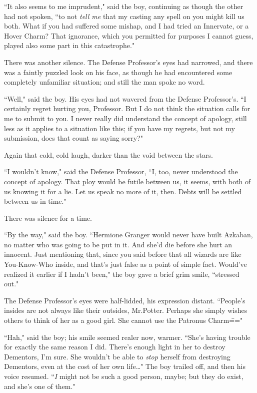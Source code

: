 ``It also seems to me imprudent," said the boy, continuing as though the other had not spoken, ``to not \emph{tell me} that my casting any spell on you might kill us both. What if you had suffered some mishap, and I had tried an Innervate, or a Hover Charm? That ignorance, which you permitted for purposes I cannot guess, played also some part in this catastrophe."

There was another silence. The Defense Professor's eyes had narrowed, and there was a faintly puzzled look on his face, as though he had encountered some completely unfamiliar situation; and still the man spoke no word.

``Well," said the boy. His eyes had not wavered from the Defense Professor's. ``I certainly regret hurting you, Professor. But I do not think the situation calls for me to submit to you. I never really did understand the concept of apology, still less as it applies to a situation like this; if you have my regrets, but not my submission, does that count as saying sorry?"

Again that cold, cold laugh, darker than the void between the stars.

``I wouldn't know," said the Defense Professor, ``I, too, never understood the concept of apology. That ploy would be futile between us, it seems, with both of us knowing it for a lie. Let us speak no more of it, then. Debts will be settled between us in time."

There was silence for a time.

``By the way," said the boy. ``Hermione Granger would never have built Azkaban, no matter who was going to be put in it. And she'd die before she hurt an innocent. Just mentioning that, since you said before that all wizards are like You-Know-Who inside, and that's just false as a point of simple fact. Would've realized it earlier if I hadn't been," the boy gave a brief grim smile, ``stressed out."

The Defense Professor's eyes were half-lidded, his expression distant. ``People's insides are not always like their outsides, Mr.\?Potter. Perhaps she simply wishes others to think of her as a good girl. She cannot use the Patronus Charm\==="

``Hah," said the boy; his smile seemed realer now, warmer. ``She's having trouble for exactly the same reason I did. There's enough light in her to destroy Dementors, I'm sure. She wouldn't be able to \emph{stop} herself from destroying Dementors, even at the cost of her own life{\ldots}" The boy trailed off, and then his voice resumed. ``\emph{I} might not be such a good person, maybe; but they do exist, and she's one of them."


